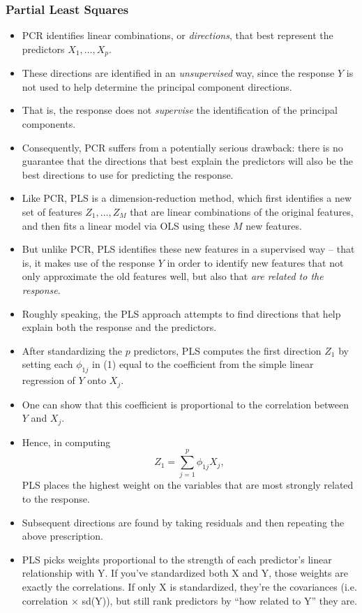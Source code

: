 \documentclass{article}
\begin{document}
\subsubsection{Partial Least Squares}
\begin{itemize}
  \item PCR identifies linear combinations, or \emph{directions}, that best represent the predictors \(X_1,\dots,X_p\).
  \item These directions are identified in an \emph{unsupervised} way, since the response \(Y\) is not used to help determine the principal component directions.
  \item That is, the response does not \emph{supervise} the identification of the principal components.
  \item Consequently, PCR suffers from a potentially serious drawback: there is no guarantee that the directions that best explain the predictors will also be the best directions to use for predicting the response.
  \item Like PCR, PLS is a dimension‐reduction method, which first identifies a new set of features \(Z_1,\dots,Z_M\) that are linear combinations of the original features, and then fits a linear model via OLS using these \(M\) new features.
  \item But unlike PCR, PLS identifies these new features in a supervised way – that is, it makes use of the response \(Y\) in order to identify new features that not only approximate the old features well, but also that \emph{are related to the response}.
  \item Roughly speaking, the PLS approach attempts to find directions that help explain both the response and the predictors.
  \item After standardizing the $p$ predictors, PLS computes the first direction $Z_1$ by setting each $\phi_{1j}$ in (1) equal to the coefficient from the simple linear regression of $Y$ onto $X_j$.
  \item One can show that this coefficient is proportional to the correlation between $Y$ and $X_j$.
  \item Hence, in computing 
    \[
      Z_1 = \sum_{j=1}^p \phi_{1j} X_j,
    \]
    PLS places the highest weight on the variables that are most strongly related to the response.
  \item Subsequent directions are found by taking residuals and then repeating the above prescription.
  \item  PLS picks weights proportional to the strength of each predictor’s linear relationship with Y. If you’ve standardized both X and Y, those weights are exactly the correlations. If only X is standardized, they’re the covariances (i.e. correlation × sd(Y)), but still rank predictors by “how related to Y” they are.

\end{itemize}
\end{document}
